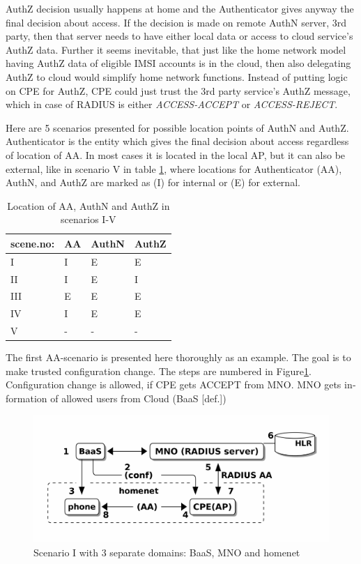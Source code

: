 \documentclass[12pt,a4paper,english]{tutthesis}
\begin{document}
\begin{otherlanguage}{english}
AuthZ decision usually happens at home and the Authenticator gives
anyway the final decision about access.
If the decision is made on remote AuthN server, 3rd party, 
then that server needs to have either local data or access to 
cloud service's AuthZ data.
Further it seems inevitable, that just like the home network model
having AuthZ data of eligible IMSI accounts is in the cloud, 
then also delegating AuthZ to cloud would simplify home network 
functions. Instead of putting logic on CPE for AuthZ, CPE
could just trust the 3rd party service's AuthZ message, which in case
of RADIUS is either \emph{ACCESS-ACCEPT} or \emph{ACCESS-REJECT}.


Here are  5 scenarios presented for possible location points of AuthN and 
AuthZ. Authenticator is the entity which gives the final decision 
about access regardless of location of AA.
In most cases it is located in the
local AP, but it can also be external, like in scenario V in 
table \ref{table-scenarios}, where locations for Authenticator (AA),
AuthN, and AuthZ are marked as (I) for internal or (E) for external.

\begin{table}[htb]
\caption{\label{table-scenarios}Location of AA, AuthN and AuthZ in scenarios I-V}
\centering
\begin{tabular}{llll}
scene.no: & AA & AuthN & AuthZ\\
\hline
I & I & E & E\\
II & I & E & I\\
III & E & E & E\\
IV & I & E & E\footnotemark\\
V & - & - & -\\
\end{tabular}
\end{table}


\label{scenario-i}
The first AA-scenario is presented here thoroughly as an example.
The goal is to make trusted configuration change. 
The steps are numbered in Figure\ref{fig:scenario-I}.
Configuration change is allowed, if CPE gets ACCEPT from MNO.  MNO gets
information of allowed users from Cloud (BaaS [def.])


\begin{figure}[htb]
\centering
\includegraphics[width=.9\linewidth]{scenI.png}
\caption{\label{fig:scenario-I}Scenario I with 3 separate domains: BaaS, MNO and homenet}
\end{figure}


\end{otherlanguage}
\end{document}
